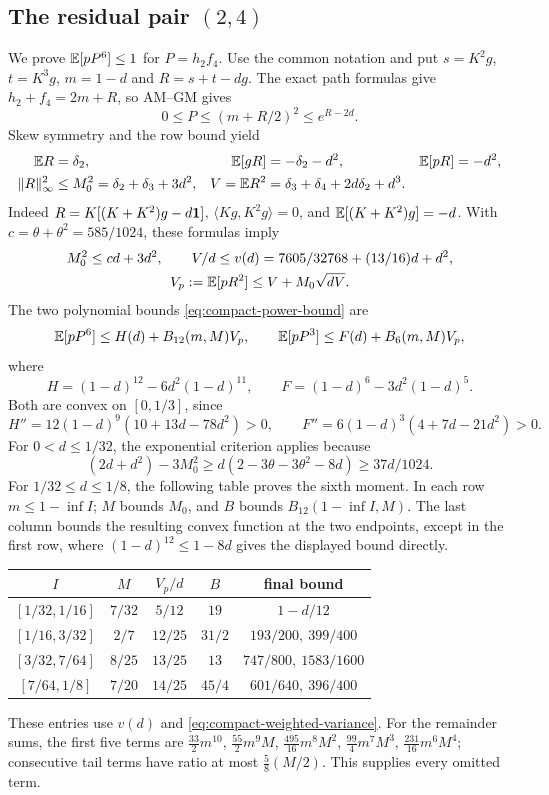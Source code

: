 \subsection[The residual pair (2,4)]{The residual pair $(2,4)$}\label{loc:S3}
We prove $\mathbb E[pP^6]\le1$ for $P=h_2f_4$. Use the common notation and put
$s=K^2g$, $t=K^3g$, $m=1-d$ and $R=s+t-dg$.
The exact path formulas give $h_2+f_4=2m+R$, so AM--GM gives
\[
 0\le P\le(m+R/2)^2\le e^{R-2d}.
\]
Skew symmetry and the row bound yield
\begin{align*}
 \mathbb E R&=\delta_{2},&\mathbb E[gR]&=-\delta_{2}-d^2,&\mathbb E[pR]&=-d^2,\\
 \|R\|_\infty^2&\le M_0^2=\delta_{2}+\delta_{3}+3d^2,&
 V=\mathbb E R^2&=\delta_{3}+\delta_{4}+2d\delta_{2}+d^3.
\end{align*}
Indeed $R=K[(K+K^2)g-d\mathbf1]$,
$\langle Kg,K^2g\rangle=0$, and $\mathbb E[(K+K^2)g]=-d$.
With $c=\theta+\theta^2=585/1024$, these formulas imply
\[
 \begin{gathered}
 M_0^2\le cd+3d^2,\qquad
 V/d\le v(d)=7605/32768+(13/16)d+d^2,\\
 V_p:=\mathbb E[pR^2]\le V+M_0\sqrt{dV}.
 \end{gathered}
\]
The two polynomial bounds \eqref{eq:compact-power-bound} are
\[
 \mathbb E[pP^6]\le H(d)+B_{12}(m,M)V_p,\qquad
 \mathbb E[pP^3]\le F(d)+B_6(m,M)V_p,
\]
where
\[
 H=(1-d)^{12}-6d^2(1-d)^{11},\qquad
 F=(1-d)^6-3d^2(1-d)^5.
\]
Both are convex on $[0,1/3]$, since
\[
 H''=12(1-d)^9(10+13d-78d^2)>0,\qquad
 F''=6(1-d)^3(4+7d-21d^2)>0.
\]
For $0<d\le1/32$, the exponential criterion applies because
\[
 (2d+d^2)-3M_0^2
 \ge d(2-3\theta-3\theta^2-8d)\ge37d/1024.
\]
For $1/32\le d\le1/8$, the following table proves the sixth moment.
In each row $m\le1-\inf I$; $M$ bounds $M_0$, and $B$ bounds
$B_{12}(1-\inf I,M)$. The last column bounds the resulting convex
function at the two endpoints, except in the first row, where
$(1-d)^{12}\le1-8d$ gives the displayed bound directly.
\begin{center}
\begin{tabular}{@{}ccccc@{}}
\toprule
$I$ & $M$ & $V_p/d$ & $B$ & final bound\\\midrule
$[1/32,1/16]$ & $7/32$ & $5/12$ & $19$ & $1-d/12$\\
$[1/16,3/32]$ & $2/7$ & $12/25$ & $31/2$ & $193/200,\ 399/400$\\
$[3/32,7/64]$ & $8/25$ & $13/25$ & $13$ & $747/800,\ 1583/1600$\\
$[7/64,1/8]$ & $7/20$ & $14/25$ & $45/4$ & $601/640,\ 396/400$\\
\bottomrule
\end{tabular}
\end{center}
These entries use $v(d)$ and \eqref{eq:compact-weighted-variance}.
For the remainder sums, the first five terms are
$\frac{33}2m^{10}$, $\frac{55}2m^9M$, $\frac{495}{16}m^8M^2$,
$\frac{99}4m^7M^3$, $\frac{231}{16}m^6M^4$; consecutive tail terms
have ratio at most $\frac58(M/2)$. This supplies every omitted term.

